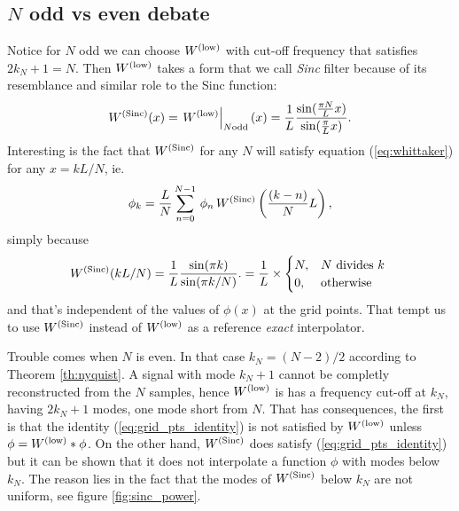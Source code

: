 \subsection{\bf $N$ odd vs even debate}

\noindent Notice for $N$ odd we can choose $W^\mathrm{(low)}$ with cut-off frequency that satisfies 
$2 k_N + 1 = N$. Then $W^\mathrm{(low)}$ takes a form that we call \emph{Sinc} filter
because of its resemblance and similar role to the Sinc function:
\begin{equation}
    W^\mathrm{(Sinc)}(x)
     = \left.W^\mathrm{(low)}\right|_{N\text{odd}}(x)
  = \frac{1}{L} \frac{  \sin(\frac{\pi N}{L} x)  }{\sin(\frac{\pi}{L}x)}.
  \label{eq:sinc}
\end{equation}
Interesting is the fact that $W^\mathrm{(Sinc)}$ for any $N$ will satisfy equation
(\ref{eq:whittaker}) for any $x = k L / N$, ie.
\begin{equation}
    \phi_k = 
            \frac{L}{N} \sum_{n=0}^{N-1} \,
                \phi_n\,
                 W^\mathrm{(Sinc)}\left(\frac{(k-n)}{N}L\right),
    \label{eq:grid_pts_identity}
\end{equation}
simply because
\begin{equation}
    W^\mathrm{(Sinc)}( k L/N)
  = \frac{1}{L} \frac{  \sin(\pi k)  }{\sin(\pi k/N)}.
  = \frac{1}{L} \times 
    \begin{cases}
    N, & \text{$N$ divides $k$ }\\
    0, & \text{otherwise}
    \end{cases}
\end{equation}
and that's independent of the values of $\phi(x)$ at the grid points.
That tempt us to use $W^\mathrm{(Sinc)}$ instead of $W^\mathrm{(low)}$ as
a reference \emph{exact} interpolator.

Trouble comes when $N$ is even.
In that case $k_N = ( N-2 )/ 2$ according to Theorem \ref{th:nyquist}.
A signal with mode $k_N+1$ cannot be completly reconstructed from 
the $N$ samples, hence $W^\mathrm{(low)}$ is has a frequency cut-off at $k_N$,
having $2 k_N+1$ modes, one mode short from $N$.
That has consequences, the first is that the identity 
(\ref{eq:grid_pts_identity}) is not satisfied by $W^\mathrm{(low)}$
unless $\phi = W^\mathrm{(low)} * \phi$.
On the other hand, $W^\mathrm{(Sinc)}$ does satisfy (\ref{eq:grid_pts_identity})
but it can be shown that it does not interpolate a function $\phi$
with modes below $k_N$. The reason lies in the fact that
the modes of $W^\mathrm{(Sinc)}$ below $k_N$ are not uniform, see figure
\ref{fig:sinc_power}.

